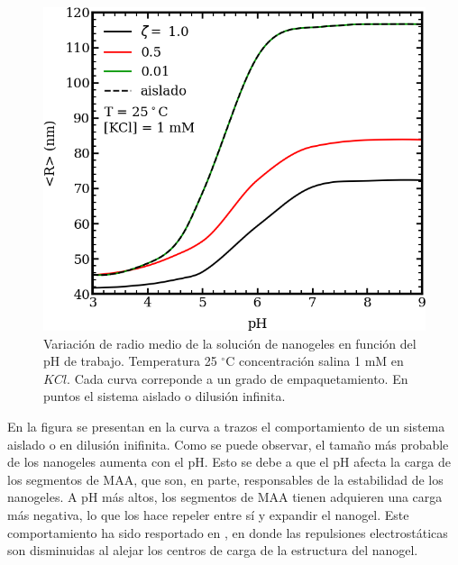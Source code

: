 	
	\begin{figure}[!htb]
		\centering
		\includegraphics[width=0.45\linewidth]{Figures/graph-mc/rvspH-phis.png}
		\caption{Variaci\'on de radio medio de la soluci\'on de nanogeles en funci\'on del pH de trabajo. Temperatura 25 $^\circ$C concentraci\'on salina 1 mM en $KCl$. Cada curva correponde a un grado de empaquetamiento. En puntos el sistema aislado o dilusi\'on infinita.}
		\label{fig:mc:rvspH}
	\end{figure}
	
	
	En la figura se presentan en la curva a trazos el comportamiento de un sistema aislado o en dilusi\'on inifinita.
	Como se puede observar, el tama\~no m\'as probable de los nanogeles aumenta con el pH. Esto se debe a que el pH afecta la carga de los segmentos de MAA, que son, en parte,  responsables de la estabilidad de los nanogeles. A pH m\'as altos, los segmentos de MAA tienen adquieren una carga m\'as negativa, lo que los hace repeler entre s\'i y expandir el nanogel.
	Este comportamiento ha sido resportado en \cite{perez2021thermodynamic}, en donde las repulsiones electrost\'aticas son disminuidas al alejar los centros de carga de la estructura del nanogel.
	
